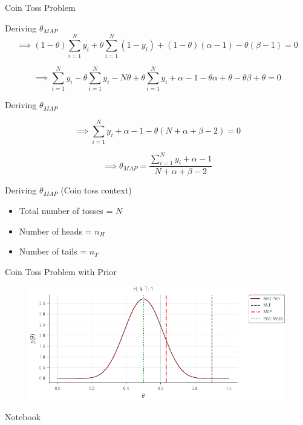 \documentclass{beamer}
\begin{document}
\begin{section}{Coin Toss Problem}
\begin{frame}{Deriving $\theta_{MAP}$}
        \begin{equation*}
            \implies (1 - \theta) \sum_{i = 1}^{N} y_i + \theta \sum_{i = 1}^{N} (1 - y_i) + (1 - \theta) (\alpha - 1) - \theta (\beta - 1) = 0
        \end{equation*}

        \begin{equation*}
            \implies \sum_{i = 1}^{N} y_i - \theta \sum_{i = 1}^{N} y_i - N \theta + \theta \sum_{i = 1}^{N} y_i + \alpha - 1 - \theta \alpha  + \theta - \theta \beta + \theta = 0
        \end{equation*}

    \end{frame}

    \begin{frame}{Deriving $\theta_{MAP}$}

        \begin{equation*}
            \implies \sum_{i = 1}^{N} y_i + \alpha - 1 - \theta ( N + \alpha + \beta - 2) = 0
        \end{equation*}

        \begin{equation*}
            \implies \theta_{MAP} = \frac{\sum_{i = 1}^{N} y_i + \alpha - 1}{N + \alpha + \beta - 2}
        \end{equation*}
    \end{frame}

    \begin{frame}{Deriving $\theta_{MAP}$ (Coin toss context)}
        \begin{itemize}
            \item Total number of tosses = $N$
            \item Number of heads = $n_H$
            \item Number of tails = $n_T$
        \end{itemize}
        
    \end{frame}

    \begin{frame}{Coin Toss Problem with Prior}
        \begin{figure}
            \centerline{\includegraphics[scale = 0.75]{../figures/map/coin_toss_prior_mle_map.pdf}}
        \end{figure}

    Notebook
    \end{frame}
\end{section}
\end{document}

